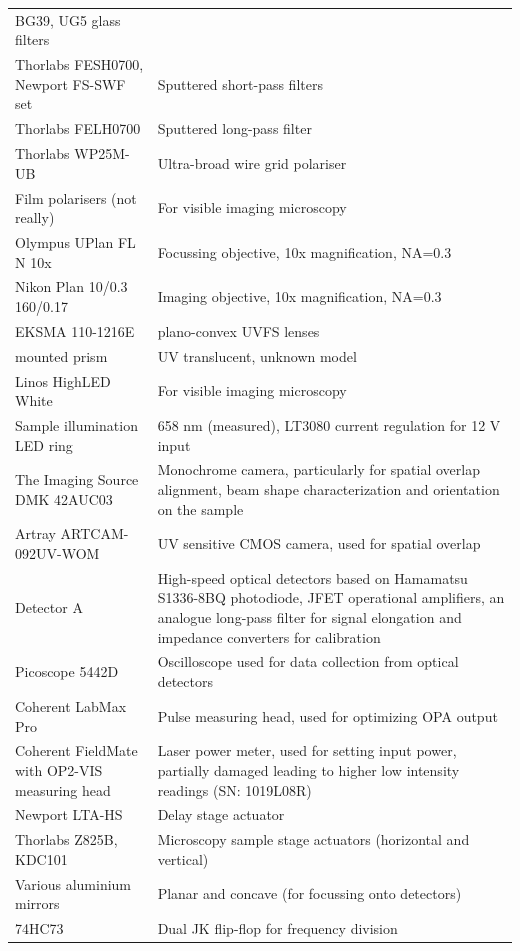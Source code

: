 \documentclass[twoside,openright]{scrreprt}
\begin{document}
\begin{longtable}{p{}p{}}
    BG39, UG5 glass filters \\
    Thorlabs FESH0700, Newport FS-SWF set & Sputtered short-pass filters \\
    Thorlabs FELH0700 & Sputtered long-pass filter \\
    Thorlabs WP25M-UB & Ultra-broad wire grid polariser \\
    Film polarisers (not really) & For visible imaging microscopy \\
    Olympus UPlan FL N 10x & Focussing objective, 10x magnification, NA=0.3 \\
    Nikon Plan 10/0.3 160/0.17 & Imaging objective, 10x magnification, NA=0.3 \\
    EKSMA 110-1216E & plano-convex UVFS lenses\\
    mounted prism & UV translucent, unknown model\\
    Linos HighLED White & For visible imaging microscopy \\
    Sample illumination LED ring & 658 nm (measured), LT3080 current regulation for 12 V input \\
    The Imaging Source DMK 42AUC03 & Monochrome camera, particularly for spatial overlap alignment, beam shape characterization and orientation on the sample \\
    Artray ARTCAM-092UV-WOM & UV sensitive CMOS camera, used for spatial overlap\\
    Detector A & High-speed optical detectors based on Hamamatsu S1336-8BQ photodiode, JFET operational amplifiers, an analogue  long-pass filter for signal elongation and impedance converters for calibration \\
    Picoscope 5442D & Oscilloscope used for data collection from optical detectors \\
    Coherent LabMax Pro & Pulse measuring head, used for optimizing OPA output \\
    Coherent FieldMate with OP2-VIS measuring head & Laser power meter, used for setting input power, partially damaged leading to higher low intensity readings (SN: 1019L08R) \\
    Newport LTA-HS & Delay stage actuator \\
    Thorlabs Z825B, KDC101 & Microscopy sample stage actuators (horizontal and vertical) \\
    Various aluminium mirrors & Planar and concave (for focussing onto detectors) \\
    74HC73 & Dual JK flip-flop for frequency division
\end{longtable}
\end{document}

